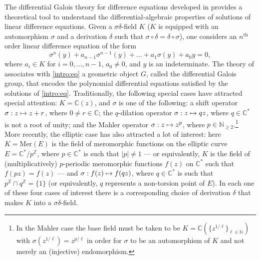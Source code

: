 \documentclass[JEP,XML,SOM,Unicode]{cedram}
\newcommand\mto{\mathchoice{\longmapsto}{\mapsto}{\mapsto}{\mapsto}}
\theoremstyle{definition}
\begin{document}
The differential Galois theory for difference equations developed in \cite{HS} provides a theoretical tool to understand the differential-algebraic properties of solutions of linear difference equations. Given a $\sigma\delta$-field $K$ (\ie $K$ is equipped with an automorphism $\sigma$ and a derivation $\delta$ such that $\sigma\circ\delta=\delta\circ\sigma$), one considers an $n^\text{th}$ order linear difference equation of the form\vspace*{-3pt}
\begin{equation}\label{intro:eq} \sigma^n(y)+a_{n-1}\sigma^{n-1}(y)+\dots+a_1\sigma(y)+a_0y=0,\end{equation}
where $a_i\in K$ for $i=0,\dots,n-1$, $a_0\neq 0$, and $y$ is an indeterminate. The theory of \cite{HS} associates with \eqref{intro:eq} a geometric object $G$, called the differential Galois group, that encodes the polynomial differential equations satisfied by the solutions of \eqref{intro:eq}. Traditionally, the following special cases have attracted special attention: $K=\mathbb{C}(z)$, and $\sigma$ is one of the following: a shift operator $\sigma:z\mto z+r$, where $0\neq r\in\mathbb{C}$; the $q$-dilation operator $\sigma: z\mto qz$, where $q\in\mathbb{C}^*$ is not a root of unity; and the Mahler operator $\sigma : z\mto z^p$, where $p\in\mathbb{N}_{\geq 2}$.\footnote{In the Mahler case the base field must be taken to be $K=\mathbb{C}(\{z^{1/\ell}\}_{\ell\in\mathbb{N}})$ with $\sigma(z^{1/\ell})=z^{p/\ell}$ in order for $\sigma$ to be an automorphism of $K$ and not merely an (injective) endomorphism.} More recently, the elliptic case has also attracted a lot of interest: here $K=\mathrm{Mer}(E)$ is the field of meromorphic functions on the elliptic curve $E=\mathbb{C}^*/p^\mathbb{Z}$, where $p\in\mathbb{C}^*$ is such that $|p|\neq 1$ --- or equivalently, $K$ is the field of (multiplicatively) $p$-periodic meromorphic functions $f(z)$ on $\mathbb{C}^*$ such that $f(pz)=f(z)$ --- and $\sigma:f(z)\mto f(qz)$, where $q\in\mathbb{C}^*$ is such that $p^\mathbb{Z}\cap q^\mathbb{Z}=\{1\}$ (or equivalently, $q$ represents a non-torsion point of $E$). In each one of these four cases of interest there is a corresponding choice of derivation $\delta$ that makes $K$ into a $\sigma\delta$-field.
\end{document}
